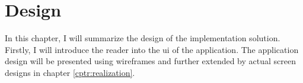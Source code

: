\chapter{Design}\label{cptr:design}

In this chapter, I will summarize the design of the implementation solution.
Firstly, I will introduce the reader into the \gls{ui} of the application.
The application design will be presented using wireframes and further extended by actual screen designs in chapter \ref{cptr:realization}.






